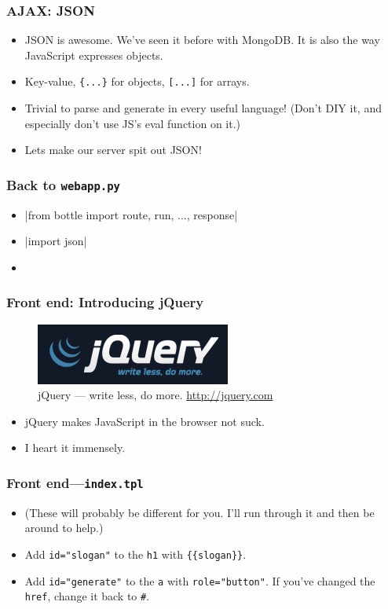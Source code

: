\documentclass{beamer}
\begin{document}
\begin{frame}[fragile]
  \frametitle{AJAX: JSON}
  \begin{itemize}
  \item JSON is awesome. We've seen it before with MongoDB. It is also
    the way JavaScript expresses objects.
  \item Key-value, \texttt{\{...\}} for objects, \texttt{[...]} for
    arrays.
  \item Trivial to parse and generate in every useful language! (Don't
    DIY it, and especially don't use JS's eval function on it.)
  \item Lets make our server spit out JSON!
  \end{itemize}
\end{frame}

\begin{frame}[fragile]
  \frametitle{Back to \texttt{webapp.py}}
  \begin{itemize}
  \item {}|from bottle import route, run, ..., response| 
  \item {}|import json|
  \item \inputminted[firstline=21,lastline=25]{python}{../steps/03-frontend/04-demo-app/webapp.py}
  \end{itemize}
\end{frame}

\begin{frame}
  \frametitle{Front end: Introducing jQuery}
  \begin{figure}[h!]
    \centering
    \includegraphics{imgs/jquery_logo}
    \caption{jQuery --- write less, do more. \url{http://jquery.com}}
    \label{fig:jquery}
  \end{figure}
  \begin{itemize}
  \item jQuery makes JavaScript in the browser not suck.
  \item I heart it immensely.
  \end{itemize}
\end{frame}

\begin{frame}
  \frametitle{Front end---\texttt{index.tpl}}
  \begin{itemize}
  \item (These will probably be different for you. I'll run through it
    and then be around to help.)
  \item Add \texttt{id="slogan"} to the \texttt{h1} with
    \texttt{\{\{slogan\}\}}.
  \item Add \texttt{id="generate"} to the \texttt{a} with
    \texttt{role="button"}. If you've changed the \texttt{href},
    change it back to \texttt{\#}.
  \end{itemize}
\end{frame}
\end{document}
